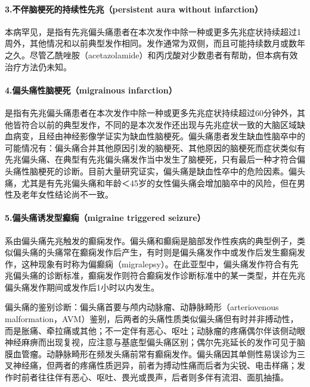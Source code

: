 \paragraph{3.不伴脑梗死的持续性先兆（persistent aura without infarction）}

本病罕见，是指有先兆偏头痛患者在本次发作中除一种或更多先兆症状持续超过1周外，其他情况和以前典型发作相同。发作通常为双侧，而且可能持续数月或数年之久。尽管乙酰唑胺（acetazolamide）和丙戊酸对少数患者有帮助，但本病有效治疗方法仍未知。

\paragraph{4.偏头痛性脑梗死（migrainous infarction）}

是指有先兆偏头痛患者在本次发作中除一种或更多先兆症状持续超过60分钟外，其他皆符合以前的典型发作，不同的是本次发作还出现与先兆症状一致的大脑区域缺血病变，且经由神经影像学证实为缺血性脑梗死。偏头痛患者发生缺血性脑卒中的可能情况有：偏头痛合并其他原因引发的脑梗死、其他原因的脑梗死而症状类似有先兆偏头痛、在典型有先兆偏头痛发作当中发生了脑梗死，只有最后一种才符合偏头痛性脑梗死的诊断。目前大量研究证实，偏头痛是缺血性卒中的危险因素。偏头痛，尤其是有先兆偏头痛和年龄＜45岁的女性偏头痛会增加脑卒中的风险，但在男性及老年女性结论尚不一致。

\paragraph{5.偏头痛诱发型癫痫（migraine triggered seizure）}

系由偏头痛先兆触发的癫痫发作。偏头痛和癫痫是脑部发作性疾病的典型例子，类似偏头痛的头痛常在癫痫发作后产生，有时则是偏头痛发作中或发作后发生癫痫发作，这种现象有时称为偏癫痫（migralepsy）。在此亚型中，偏头痛发作符合有先兆偏头痛的诊断标准，癫痫发作则符合癫痫发作诊断标准中的某一类型，并在先兆偏头痛发作期间或发作后1小时以内发生。

偏头痛的鉴别诊断：偏头痛首要与颅内动脉瘤、动静脉畸形（arteriovenous
malformation，AVM）鉴别，后两者的头痛性质类似偏头痛但有时并非搏动性，而是胀痛、牵拉痛或其他；不一定伴有恶心、呕吐；动脉瘤的疼痛偶尔伴该侧动眼神经麻痹而出现复视，应注意与基底型偏头痛区别；偶尔先兆延长的发作可见于脑膜血管瘤。动静脉畸形在频发头痛前常有癫痫发作。偏头痛因其单侧性易误诊为三叉神经痛，但两者的疼痛性质迥异，前者为搏动性痛而后者为尖锐、电击样痛；发作时前者往往伴有恶心、呕吐、畏光或畏声，后者则多伴有流泪、面肌抽搐。

\protect\hypertarget{text00348.html}{}{}

